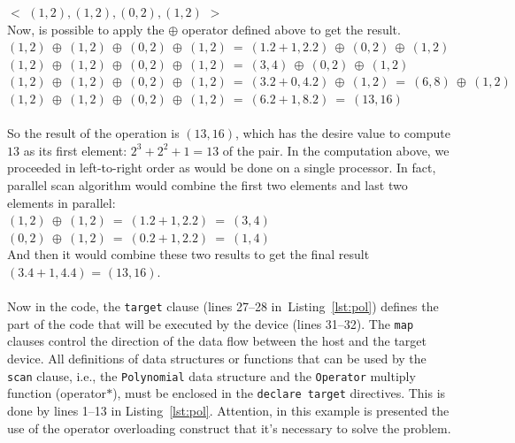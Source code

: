 \documentclass[Ingles]{ic-tese-v1}
\newcommand{\ttt}[1]{{\texttt{#1}}}
\newcommand{\rlst}[1]{Listing~\ref{lst:#1}}
\begin{document}
$<$ $(1, 2), (1, 2), (0, 2), (1, 2)$ $>$\\

Now, is possible to apply the $\oplus$ operator defined above to get the result.\\
$(1, 2)\:\oplus\:(1, 2)\:\oplus\:(0, 2)\:\oplus\:(1, 2)\:=\:(1 . 2 + 1, 2 . 2)\:\oplus\:(0, 2)\: \oplus\:(1, 2)$\\
$(1, 2)\:\oplus\:(1, 2)\:\oplus\:(0, 2)\:\oplus\:(1, 2)\:=\:(3, 4)\:\oplus\:(0, 2)\:\oplus\:(1, 2)$\\
$(1, 2)\:\oplus\:(1, 2)\:\oplus\:(0, 2)\:\oplus\:(1, 2)\:=\:(3. 2 + 0, 4 . 2)\:\oplus\:(1, 2)\:=\:(6, 8)\:\oplus\:(1, 2)$\\
$(1, 2)\:\oplus\:(1, 2)\:\oplus\:(0, 2)\:\oplus\:(1, 2)\:=\:(6 . 2 + 1, 8 . 2) \:=\:(13, 16)$\\\\
So the result of the operation is $(13, 16)$, which has the desire value to compute $13$
as its first element: $2^{3} + 2^{2} + 1 = 13$ of the pair.
In the computation above, we proceeded in left-to-right order as would be
done on a single processor. In fact, parallel scan algorithm would
combine the first two elements and last two elements in parallel:\\
$(1, 2) \:\oplus\: (1, 2) \:=\: (1 . 2 + 1, 2 . 2) \:=\: (3, 4)$\\
$(0, 2) \:\oplus\: (1, 2) \:=\: (0 . 2 + 1, 2 . 2) \:=\: (1, 4)$\\
And then it would combine these two results to get the final result $(3 . 4 + 1, 4 . 4)$
= $(13, 16)$.
\\\\
Now in the code, the \ttt{target} clause (lines 27--28 in~\rlst{pol}) defines the part of the code
that will  be  executed by  the device  (lines
31--32).  The \ttt{map} clauses control the direction  of the data flow
between the host and the target device. All definitions of data structures
or functions  that can be used  by the \ttt{scan} clause,  i.e., the
\ttt{Polynomial} data  structure and the \ttt{Operator}  multiply function
(operator$*$),  must   be  enclosed  in  the   \ttt{declare  target}
directives. This is done by lines 1--13 in \rlst{pol}.
Attention, in this example is presented the use of the operator overloading
construct that it's necessary to solve the problem.
\end{document}
